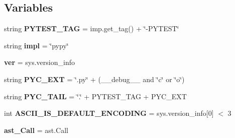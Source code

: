 \subsection*{Variables}
\begin{DoxyCompactItemize}
\item 
\mbox{\label{namespace__pytest_1_1assertion_1_1rewrite_a44b01c39706aa49c4baefea49331329c}} 
string {\bfseries P\+Y\+T\+E\+S\+T\+\_\+\+T\+AG} = imp.\+get\+\_\+tag() + \char`\"{}-\/P\+Y\+T\+E\+ST\char`\"{}
\item 
\mbox{\label{namespace__pytest_1_1assertion_1_1rewrite_a2e46987d58655b7fe1406fcc5315ad7b}} 
string {\bfseries impl} = \char`\"{}pypy\char`\"{}
\item 
\mbox{\label{namespace__pytest_1_1assertion_1_1rewrite_a4d97d2f575135b91aa0a2ce9008fc1e0}} 
{\bfseries ver} = sys.\+version\+\_\+info
\item 
\mbox{\label{namespace__pytest_1_1assertion_1_1rewrite_a3956282f3878df2610efca8ab5167eb7}} 
string {\bfseries P\+Y\+C\+\_\+\+E\+XT} = \char`\"{}.py\char`\"{} + (\+\_\+\+\_\+debug\+\_\+\+\_\+ and \char`\"{}c\char`\"{} or \char`\"{}o\char`\"{})
\item 
\mbox{\label{namespace__pytest_1_1assertion_1_1rewrite_a68a234ca4fdd8871196f9be513f576a3}} 
string {\bfseries P\+Y\+C\+\_\+\+T\+A\+IL} = \char`\"{}.\char`\"{} + P\+Y\+T\+E\+S\+T\+\_\+\+T\+AG + P\+Y\+C\+\_\+\+E\+XT
\item 
\mbox{\label{namespace__pytest_1_1assertion_1_1rewrite_a32a5a69046e475210e405147cc4ffb74}} 
int {\bfseries A\+S\+C\+I\+I\+\_\+\+I\+S\+\_\+\+D\+E\+F\+A\+U\+L\+T\+\_\+\+E\+N\+C\+O\+D\+I\+NG} = sys.\+version\+\_\+info\mbox{[}0\mbox{]} $<$ 3
\item 
\mbox{\label{namespace__pytest_1_1assertion_1_1rewrite_a8dfeab8b823723fa7daeba0e346e92f8}} 
{\bfseries ast\+\_\+\+Call} = ast.\+Call
\item 
\mbox{\label{namespace__pytest_1_1assertion_1_1rewrite_af27d772cee8c25edffcd53458706b7af}} 

\end{DoxyCompactItemize}
